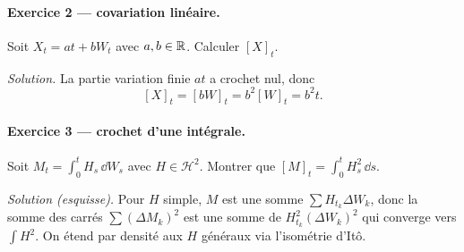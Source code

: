 \paragraph{Exercice 2 --- covariation linéaire.}
Soit $X_t=a t+b W_t$ avec $a,b\in\mathbb{R}$. Calculer $[X]_t$.

\emph{Solution.}
La partie variation finie $at$ a crochet nul, donc
\[
[X]_t=[bW]_t=b^2[W]_t=b^2 t.
\]

\paragraph{Exercice 3 --- crochet d'une intégrale.}
Soit $M_t=\int_0^t H_s\,\dd W_s$ avec $H\in\mathcal{H}^2$. Montrer que $[M]_t=\int_0^t H_s^2\,\dd s$.

\emph{Solution (esquisse).}
Pour $H$ simple, $M$ est une somme $\sum H_{t_k}\Delta W_k$, donc la somme des carrés $\sum (\Delta M_k)^2$ est une somme de $H_{t_k}^2(\Delta W_k)^2$ qui converge vers $\int H^2$.
On étend par densité aux $H$ généraux via l'isométrie d'Itô.
